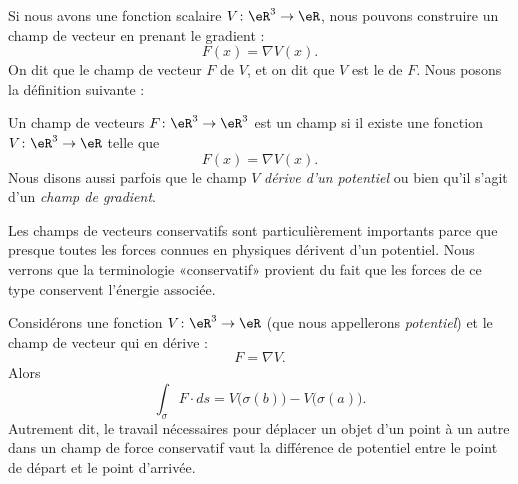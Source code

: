Si nous avons une fonction scalaire $V\colon \eR^3\to \eR$, nous pouvons construire un champ de vecteur en prenant le gradient :
\begin{equation}
    F(x)=\nabla V(x).
\end{equation}
On dit que le champ de vecteur $F$  de $V$, et on dit que $V$ est le  de $F$. Nous posons la définition suivante :
\begin{definition}
    Un champ de vecteurs $F\colon \eR^3\to \eR^3$ est un champ  si il existe une fonction $V\colon \eR^3\to \eR$ telle que
    \begin{equation}
        F(x)=\nabla V(x).
    \end{equation}
    Nous disons aussi parfois que le champ $V$ \emph{dérive d'un potentiel} ou bien qu'il s'agit d'un \emph{champ de gradient}.
\end{definition}

Les champs de vecteurs conservatifs sont particulièrement importants parce que presque toutes les forces connues en physiques dérivent d'un potentiel. Nous verrons que la terminologie «conservatif» provient du fait que les forces de ce type conservent l'énergie associée.


\begin{proposition}
    Considérons une fonction $V\colon \eR^3\to \eR$ (que nous appellerons \emph{potentiel}) et le champ de vecteur qui en dérive :
    \begin{equation}
        F=\nabla V.
    \end{equation}
    Alors 
    \begin{equation}
        \int_{\sigma}F\cdot ds=V\big( \sigma(b) \big)-V\big( \sigma(a) \big).
    \end{equation}
    Autrement dit, le travail nécessaires pour déplacer un objet d'un point à un autre dans un champ de force conservatif vaut la différence de potentiel entre le point de départ et le point d'arrivée.
\end{proposition}

